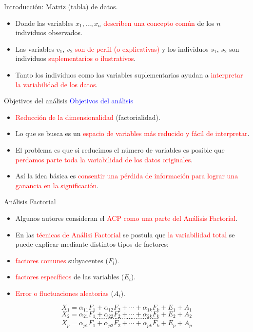 \documentclass[
  ignorenonframetext,
]{beamer}
\providecommand{\tightlist}{%
  \setlength{\itemsep}{0pt}\setlength{\parskip}{0pt}}
\newcommand\blue[1]{\textcolor{blue}{#1}}
\newcommand\red[1]{\textcolor{red}{#1}}
\begin{document}
\begin{frame}{Introducción: Matriz (tabla) de datos.}
\label{introducciuxf3n-matriz-tabla-de-datos.-1}
\begin{itemize}
\item
  Donde las variables \(x_1,\ldots, x_n\)
  \red{describen una concepto común} de los \(n\) individuos observados.
\item
  Las variables \(v_1\), \(v_2\) \red{son de perfil (o explicativas)} y
  los individuos \(s_1\), \(s_2\) son individuos
  \red{suplementarios o ilustrativos}.
\item
  Tanto los individuos como las variables suplementarias ayudan a
  \red{interpretar la variabilidad de los datos}.
\end{itemize}
\end{frame}

\begin{frame}{Objetivos del análisis}
\label{objetivos-del-anuxe1lisis}
\blue{Objetivos del análisis}

\begin{itemize}
\item
  \red{Reducción de la dimensionalidad} (factorialidad).
\item
  Lo que se busca es un \red{espacio de variables más reducido y fácil
  de interpretar}.
\item
  El problema es que si reducimos el número de variables es posible que
  \red{perdamos parte toda la variabilidad de los datos originales}.
\item
  Así la idea básica es
  \red{consentir una pérdida de información para lograr una
  ganancia en la significación}.
\end{itemize}
\end{frame}

\begin{frame}{Análisis Factorial}
\label{anuxe1lisis-factorial}
\begin{itemize}
\tightlist
\item
  Algunos autores consideran el \red{ACP como una parte del Análisis
  Factorial}.
\item
  En las \red{técnicas de Análisi Factorial} se postula que
  \red{la variabilidad total} se puede explicar mediante distintos tipos
  de factores:
\item
  \red{factores comunes} subyacentes (\(F_i\)).
\item
  \red{factores específicos} de las variables (\(E_i\)).
\item
  \red{Error o fluctuaciones aleatorias} (\(A_i\)).
\end{itemize}

\[X_1=\alpha_{1 1} F_1+ \alpha_{1 2} F_2+\cdots +\alpha_{1 k} F_k+ E_1+ A_1\]
\[X_2=\alpha_{2 1} F_1+ \alpha_{2 2} F_2+\cdots +\alpha_{2 k} F_k+ E_2+ A_2\]
\[\cdots\cdots\cdots\cdots\cdots\cdots\cdots\cdots\cdots\cdots\cdots\cdots\]
\[X_p=\alpha_{p 1} F_1+ \alpha_{p 2} F_2+\cdots +\alpha_{p k} F_k+ E_p+ A_p\]
\end{frame}
\end{document}
